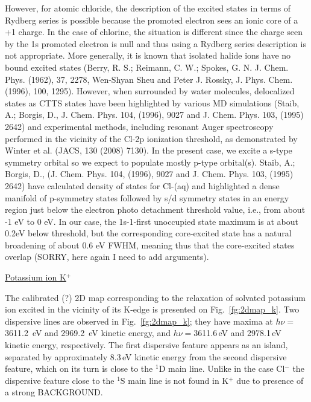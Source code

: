 {\color{red}
However, for atomic chloride, the description of the excited states in terms of Rydberg series is possible because the promoted electron sees an ionic core of a +1 charge. In the case of chlorine, the situation is different since the charge seen by the 1s promoted electron is null and thus using a Rydberg series description is not appropriate. More generally, it is known that isolated halide ions have no bound excited states (Berry, R. S.; Reimann, C. W.; Spokes, G. N. J. Chem. Phys. (1962), 37, 2278, Wen-Shyan Sheu and Peter J. Rossky, J. Phys. Chem. (1996), 100, 1295). However, when surrounded by water molecules, delocalized states as CTTS states have been highlighted by various MD simulations (Staib, A.; Borgis, D., J. Chem. Phys. 104, (1996), 9027 and J. Chem. Phys. 103, (1995) 2642) and experimental methods, including resonant Auger spectroscopy performed in the vicinity of the Cl-2p ionization threshold, as demonstrated by Winter et al. (JACS, 130 (2008) 7130). In the present case, we excite a s-type symmetry orbital so we expect to populate mostly p-type orbital(s). Staib, A.; Borgis, D., (J. Chem. Phys. 104, (1996), 9027 and J. Chem. Phys. 103, (1995) 2642) have calculated density of states for Cl-(aq) and highlighted a dense manifold of p-symmetry states followed by s/d symmetry states in an energy region just below the electron photo detachment threshold value, i.e., from about -1 eV to 0 eV. In our case, the 1s-1-first unoccupied state maximum is at about 0.2eV below threshold, but the corresponding core-excited state has a natural broadening of about 0.6 eV FWHM, meaning thus that the core-excited states overlap (SORRY, here again I need to add arguments).

}


\underline{Potassium ion K$^{+}$}

The calibrated (?) 2D map corresponding to the relaxation of solvated potassium ion excited in the vicinity of its K-edge is presented on Fig.\ \ref{fg:2dmap_k}. Two dispersive lines are observed in Fig.\ \ref{fg:2dmap_k}; they have maxima at $h\nu = $3611.2 \,eV and 2969.2 \,eV kinetic energy, and $h\nu = $3611.6\,eV and 2978.1\,eV kinetic energy, respectively. The first dispersive feature appears as an island, separated by approximately 8.3\,eV kinetic energy from the second dispersive feature, which on its turn is close to the $^1$D main line. Unlike in the case Cl$^{-}$ the dispersive feature close to the $^1$S main line is not found in K$^{+}$ due to presence of a strong {\color{red}BACKGROUND}.